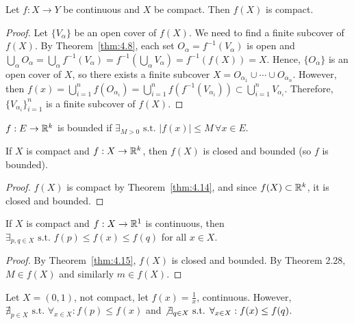 \begin{theorem}[14]
	Let $f: X\to Y$ be continuous and $X$ be compact. Then $f(X)$ is compact.
	\begin{proof}
		Let $\{ V_{\alpha} \}$ be an open cover of $f(X)$.
		We need to find a finite subcover of $f(X)$.
		By Theorem~\ref{thm:4.8}, each set $O_{\alpha}=f^{-1}(V_{\alpha})$ is open and $\bigcup_{\alpha} O_{\alpha}=\bigcup_{\alpha} f^{-1}(V_{\alpha})=f^{-1}(\bigcup_{\alpha}V_{\alpha})=f^{-1}(f(X))=X$. Hence, $\{O_{\alpha}\} $ is an open cover of $X$, so there exists a finite subcover $X=O_{\alpha_1} \cup \cdots \cup O_{\alpha_n}$.
		However, then $f(x)=\bigcup_{i=1}^{n}f(O_{\alpha_{i}})= \bigcup_{i=1}^{n}f(f^{-1}(V_{\alpha_{i}})) \subset \bigcup_{i=1}^{n}V_{\alpha_i}$. Therefore, $\{V_{\alpha_{i}}\}^{n}_{i=1}$ is a finite subcover of $f(X)$.
	\end{proof}
\end{theorem}
\begin{definition}[4.13]
	\label{def:4.13}
	$f: E \to \mathbb{R}^{k}$ is bounded if $\exists_{M>0} \text{ s.t. } |f(x)|\le M\, \forall x \in E$.
\end{definition}

\begin{theorem}[15]
	If $X$ is compact and $f:X\to \mathbb{R}^{k}$, then $f(X)$ is closed and bounded (so $f$ is bounded).
	\begin{proof}
		$f(X)$ is compact by Theorem~\ref{thm:4.14}, and since $f(X) \subset \mathbb{R}^{k}$, it is closed and bounded.
	\end{proof}
\end{theorem}

\begin{thm}[16]
	If $X$ is compact and $f:X\to \mathbb{R}^{1}$ is continuous, then $\exists_{p,q \in X}\text{ s.t. } f(p)\le f(x)\le f(q)$ for all $x \in X$.
	\begin{proof}
		By Theorem~\ref{thm:4.15}, $f(X)$ is closed and bounded.
		By Theorem 2.28, $M \in f(X)$ and similarly $m \in f(X)$.
	\end{proof}
\end{thm}
\begin{example}
	Let $X=(0,1)$, not compact, let $f(x)=\frac{1}{x}$, continuous. However, $\nexists_{p \in X} \text{ s.t. } \forall_{x \in X}:  f(p)\le f(x)$ and $\not \exists_{q \in X} \text{ s.t. } \forall_{x \in X}:  f(x)\le f(q)$.
\end{example}


